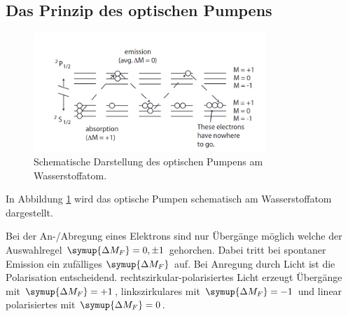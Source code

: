 \subsection{Das Prinzip des optischen Pumpens}
\begin{figure}
    \centering
    \includegraphics[width = 0.78\textwidth]{pics/pumpen.png}
    \caption{Schematische Darstellung des optischen Pumpens am Wasserstoffatom.\cite{op}}
    \label{pic:pump}
\end{figure}
In Abbildung \ref{pic:pump} wird das optische Pumpen schematisch am Wasserstoffatom dargestellt.

Bei der An-/Abregung eines Elektrons sind nur Übergänge möglich welche der Auswahlregel $\symup{\Delta{M_F}} = 0, \pm 1$ gehorchen.
Dabei tritt bei spontaner Emission ein zufälliges $\symup{\Delta{M_F}}$ auf. Bei Anregung durch Licht ist die Polarisation entscheidend.
rechtszirkular-polarisiertes Licht erzeugt Übergänge mit $\symup{\Delta{M_F}} = +1$, linkszirkulares mit $\symup{\Delta{M_F}} = -1$ und linear polarisiertes
mit $\symup{\Delta{M_F}} = 0$.

